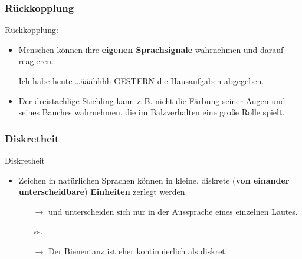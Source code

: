 \subsubsection{Rückkopplung}

\begin{frame}{Rückkopplung:}
	
	\begin{itemize}
		\item<1-> Menschen können ihre \textbf{eigenen Sprachsignale} wahrnehmen und darauf reagieren.
		
\ea Ich habe heute \ldots ääähhhh GESTERN die Hausaufgaben abgegeben.
\z

		\item<2->[$\rightarrow$] Der dreistachlige Stichling kann z.\,B. nicht die Färbung seiner Augen und seines Bauches wahrnehmen, die im Balzverhalten eine große Rolle spielt.
			\item[]
		\end{itemize}

\end{frame}


\subsubsection{Diskretheit}

\begin{frame}{Diskretheit}
			
	\begin{itemize}
		\item Zeichen in natürlichen Sprachen können in kleine, diskrete (\textbf{von einander unterscheidbare}) \textbf{Einheiten} zerlegt werden.

\pause
				
		\begin{itemize}
			\item[]
			\item[$\rightarrow$]  und  unterscheiden sich nur in der Aussprache eines einzelnen Lautes.
			
			\ea {} vs. 
			\z 
			
			\item[$\rightarrow$] Der Bienentanz ist eher kontinuierlich als diskret.						
		\end{itemize}
	
	\end{itemize}

\end{frame}


